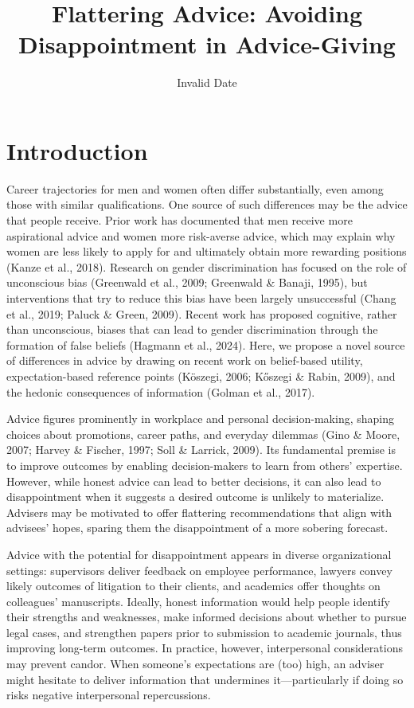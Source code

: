 \documentclass[
  man,
  floatsintext,
  longtable,
  nolmodern,
  notxfonts,
  notimes,
  colorlinks=true,linkcolor=blue,citecolor=blue,urlcolor=blue]{apa7}
\title{Flattering Advice: Avoiding Disappointment in Advice-Giving}
\date{Invalid Date}
\begin{document}
\maketitle


\setcounter{secnumdepth}{-\maxdimen} %

\setlength\LTleft{0pt}


\section{Introduction}\label{introduction}

Career trajectories for men and women often differ substantially, even
among those with similar qualifications. One source of such differences
may be the advice that people receive. Prior work has documented that
men receive more aspirational advice and women more risk-averse advice,
which may explain why women are less likely to apply for and ultimately
obtain more rewarding positions (Kanze et al., 2018). Research on gender
discrimination has focused on the role of unconscious bias (Greenwald et
al., 2009; Greenwald \& Banaji, 1995), but interventions that try to
reduce this bias have been largely unsuccessful (Chang et al., 2019;
Paluck \& Green, 2009). Recent work has proposed cognitive, rather than
unconscious, biases that can lead to gender discrimination through the
formation of false beliefs (Hagmann et al., 2024). Here, we propose a
novel source of differences in advice by drawing on recent work on
belief-based utility, expectation-based reference points (Köszegi, 2006;
Kőszegi \& Rabin, 2009), and the hedonic consequences of information
(Golman et al., 2017).

Advice figures prominently in workplace and personal decision-making,
shaping choices about promotions, career paths, and everyday dilemmas
(Gino \& Moore, 2007; Harvey \& Fischer, 1997; Soll \& Larrick, 2009).
Its fundamental premise is to improve outcomes by enabling
decision-makers to learn from others' expertise. However, while honest
advice can lead to better decisions, it can also lead to disappointment
when it suggests a desired outcome is unlikely to materialize. Advisers
may be motivated to offer flattering recommendations that align with
advisees' hopes, sparing them the disappointment of a more sobering
forecast.

Advice with the potential for disappointment appears in diverse
organizational settings: supervisors deliver feedback on employee
performance, lawyers convey likely outcomes of litigation to their
clients, and academics offer thoughts on colleagues' manuscripts.
Ideally, honest information would help people identify their strengths
and weaknesses, make informed decisions about whether to pursue legal
cases, and strengthen papers prior to submission to academic journals,
thus improving long-term outcomes. In practice, however, interpersonal
considerations may prevent candor. When someone's expectations are (too)
high, an adviser might hesitate to deliver information that undermines
it---particularly if doing so risks negative interpersonal
repercussions.
\end{document}
